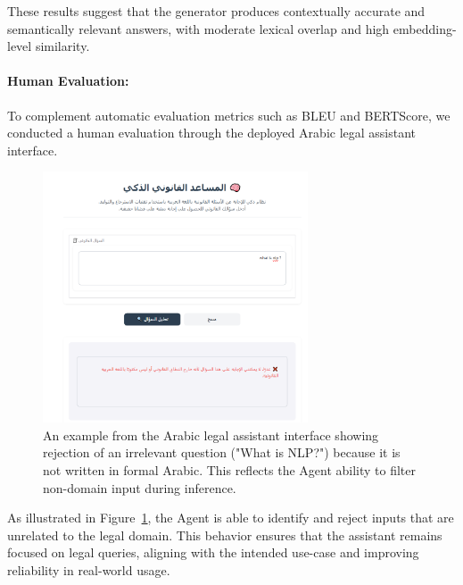 These results suggest that the generator produces contextually accurate and semantically relevant answers, with moderate lexical overlap and high embedding-level similarity.
\paragraph{Human Evaluation:}

To complement automatic evaluation metrics such as BLEU and BERTScore, we conducted a human evaluation through the deployed Arabic legal assistant interface.

\begin{figure}[H]
	\centering
	\includegraphics[width=0.7\textwidth]{Figures/evalG.png}
	\caption{An example from the Arabic legal assistant interface showing rejection of an irrelevant question ("What is NLP?") because it is not written in formal Arabic. This reflects the Agent ability to filter non-domain input during inference.}
	\label{fig_human_eval_example}
\end{figure}

As illustrated in Figure~\ref{fig_human_eval_example}, the Agent is able to identify and reject inputs that are unrelated to the legal domain. This behavior ensures that the assistant remains focused on legal queries, aligning with the intended use-case and improving reliability in real-world usage.

